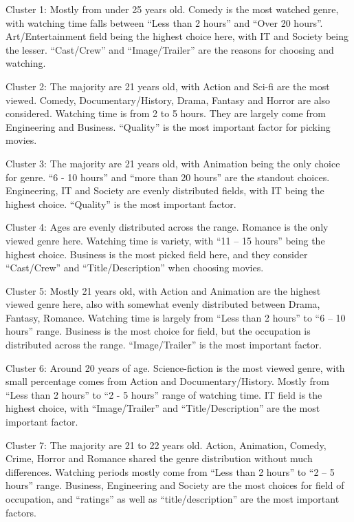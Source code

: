 Cluster 1: Mostly from under 25 years old. Comedy is the most watched genre, with watching time falls between “Less than 2 hours” and “Over 20 hours”. Art/Entertainment field being the highest choice here, with IT and Society being the lesser. “Cast/Crew” and “Image/Trailer” are the reasons for choosing and watching.
\newline

Cluster 2: The majority are 21 years old, with Action and Sci-fi are the most viewed. Comedy, Documentary/History, Drama, Fantasy and Horror are also considered. Watching time is from 2 to 5 hours. They are largely come from Engineering and Business. “Quality” is the most important factor for picking movies.
\newline

Cluster 3: The majority are 21 years old, with Animation being the only choice for genre. “6 - 10 hours” and “more than 20 hours” are the standout choices. Engineering, IT and Society are evenly distributed fields, with IT being the highest choice. “Quality” is the most important factor.
\newline

Cluster 4: Ages are evenly distributed across the range. Romance is the only viewed genre here. Watching time is variety, with “11 – 15 hours” being the highest choice. Business is the most picked field here, and they consider “Cast/Crew” and “Title/Description” when choosing movies.
\newline

Cluster 5: Mostly 21 years old, with Action and Animation are the highest viewed genre here, also with somewhat evenly distributed between Drama, Fantasy, Romance. Watching time is largely from “Less than 2 hours” to “6 – 10 hours” range. Business is the most choice for field, but the occupation is distributed across the range. “Image/Trailer” is the most important factor.
\newline

Cluster 6: Around 20 years of age. Science-fiction is the most viewed genre, with small percentage comes from Action and Documentary/History. Mostly from “Less than 2 hours” to “2 - 5 hours” range of watching time. IT field is the highest choice, with “Image/Trailer” and “Title/Description” are the most important factor. 
\newline

Cluster 7: The majority are 21 to 22 years old. Action, Animation, Comedy, Crime, Horror and Romance shared the genre distribution without much differences. Watching periods mostly come from “Less than 2 hours” to “2 – 5 hours” range. Business, Engineering and Society are the most choices for field of occupation, and “ratings” as well as “title/description” are the most important factors.

